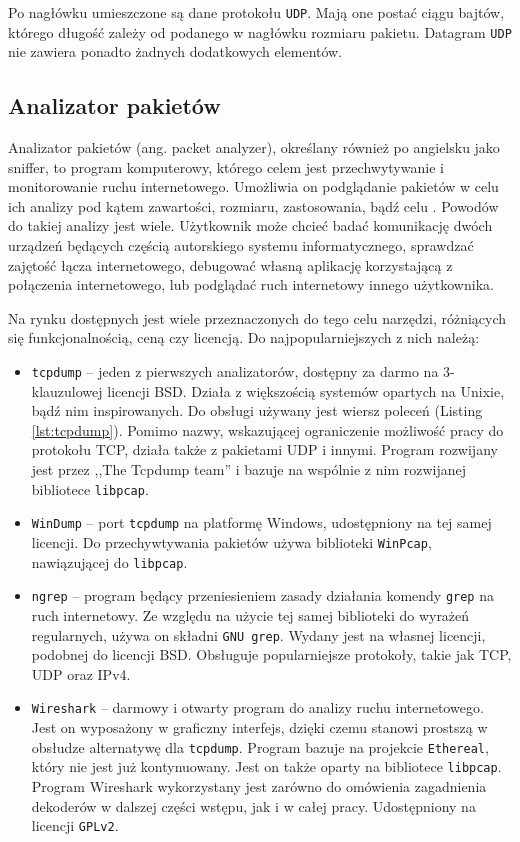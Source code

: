 \documentclass[a4paper, 11pt, twoside, openright]{article}
\begin{document}
	Po nagłówku umieszczone są dane protokołu \texttt{UDP}. Mają one postać ciągu bajtów, którego długość zależy od podanego w nagłówku rozmiaru pakietu.
	Datagram \texttt{UDP} nie zawiera ponadto żadnych dodatkowych elementów.

	\subsection{Analizator pakietów}

	\indent\par
	Analizator pakietów (ang. packet analyzer), określany również po angielsku jako sniffer, to program komputerowy, którego celem jest przechwytywanie
	i monitorowanie ruchu internetowego. Umożliwia on
	podglądanie pakietów w celu ich analizy pod kątem zawartości, rozmiaru, zastosowania, bądź celu \cite{Packet analyzer}. Powodów do takiej
	analizy jest wiele. Użytkownik może chcieć badać komunikację dwóch urządzeń będących częścią autorskiego systemu
	informatycznego, sprawdzać zajętość łącza internetowego, debugować własną aplikację korzystającą z połączenia internetowego,
	lub podglądać ruch internetowy innego użytkownika.

	Na rynku dostępnych jest wiele przeznaczonych do tego celu narzędzi, różniących się funkcjonalnością, ceną czy licencją.
	Do najpopularniejszych z nich należą:
	\begin{itemize}
		\item \texttt{tcpdump} -- jeden z pierwszych analizatorów, dostępny za darmo na 3-klauzulowej licencji BSD. Działa
			z większością systemów opartych na Unixie, bądź nim inspirowanych. Do obsługi używany jest wiersz poleceń (Listing \ref{lst:tcpdump}).
			Pomimo nazwy, wskazującej ograniczenie możliwość pracy do protokołu TCP, działa także z pakietami UDP i innymi.
			Program rozwijany jest przez ,,The Tcpdump team'' i bazuje na wspólnie z nim rozwijanej bibliotece \texttt{libpcap}.
		\item \texttt{WinDump} -- port \texttt{tcpdump} na platformę Windows, udostępniony na tej samej licencji. Do przechywtywania
			pakietów używa biblioteki \texttt{WinPcap}, nawiązującej do \texttt{libpcap}.
		\item \texttt{ngrep} -- program będący przeniesieniem zasady działania komendy \texttt{grep} na ruch internetowy.
			Ze względu na użycie tej samej biblioteki do wyrażeń regularnych, używa on składni \texttt{GNU grep}.
			Wydany jest na własnej licencji, podobnej do licencji BSD. Obsługuje popularniejsze protokoły, takie jak TCP, UDP oraz IPv4.
		\item \texttt{Wireshark} -- darmowy i otwarty program do analizy ruchu internetowego. Jest on wyposażony w graficzny
			interfejs, dzięki czemu stanowi prostszą w obsłudze alternatywę dla \texttt{tcpdump}. Program bazuje na projekcie
			\texttt{Ethereal}, który nie jest już kontynuowany. Jest on także oparty na bibliotece
			\texttt{libpcap}. Program Wireshark wykorzystany jest zarówno
			do omówienia zagadnienia dekoderów w dalszej części wstępu, jak i w całej pracy. Udostępniony na licencji \texttt{GPLv2}.
	\end{itemize}
\end{document}
